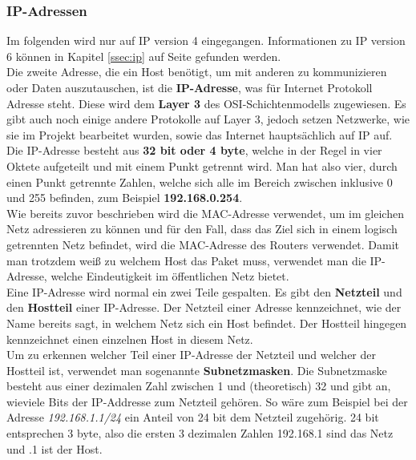 \documentclass[12pt,a4paper]{report}
\begin{document}
\begin{onehalfspace}
\subsubsection{IP-Adressen}\label{sssec:ipaddr}
Im folgenden wird nur auf IP version 4 eingegangen. Informationen zu IP version 6 können in Kapitel \ref{ssec:ip} auf Seite \pageref{ssec:ip} gefunden werden.\\

Die zweite Adresse, die ein Host benötigt, um mit anderen zu kommunizieren oder Daten auszutauschen, ist die \textbf{IP-Adresse}, was für Internet Protokoll Adresse steht. Diese wird dem \textbf{Layer 3} des OSI-Schichtenmodells zugewiesen. Es gibt auch noch einige andere Protokolle auf Layer 3, jedoch setzen Netzwerke, wie sie im Projekt bearbeitet wurden, sowie das Internet hauptsächlich auf IP auf.\\

Die IP-Adresse besteht aus \textbf{32 bit oder 4 byte}, welche in der Regel in vier Oktete aufgeteilt und mit einem Punkt getrennt wird. Man hat also vier, durch einen Punkt getrennte Zahlen, welche sich alle im Bereich zwischen inklusive 0 und 255 befinden, zum Beispiel \textbf{192.168.0.254}.\\

Wie bereits zuvor beschrieben wird die MAC-Adresse verwendet, um im gleichen Netz adressieren zu können und für den Fall, dass das Ziel sich in einem logisch getrennten Netz befindet, wird die MAC-Adresse des Routers verwendet. Damit man trotzdem weiß zu welchem Host das Paket muss, verwendet man die IP-Adresse, welche Eindeutigkeit im öffentlichen Netz bietet.\\

Eine IP-Adresse wird normal ein zwei Teile gespalten. Es gibt den \textbf{Netzteil} und den \textbf{Hostteil} einer IP-Adresse. Der Netzteil einer Adresse kennzeichnet, wie der Name bereits sagt, in welchem Netz sich ein Host befindet. Der Hostteil hingegen kennzeichnet einen einzelnen Host in diesem Netz.\\
Um zu erkennen welcher Teil einer IP-Adresse der Netzteil und welcher der Hostteil ist, verwendet man sogenannte \textbf{Subnetzmasken}. Die Subnetzmaske besteht aus einer dezimalen Zahl zwischen 1 und (theoretisch) 32 und gibt an, wieviele Bits der IP-Addresse zum Netzteil gehören. So wäre zum Beispiel bei der Adresse \textit{192.168.1.1/24} ein Anteil von 24 bit dem Netzteil zugehörig. 24 bit entsprechen 3 byte, also die ersten 3 dezimalen Zahlen 192.168.1 sind das Netz und .1 ist der Host.

\end{onehalfspace}
\end{document}
